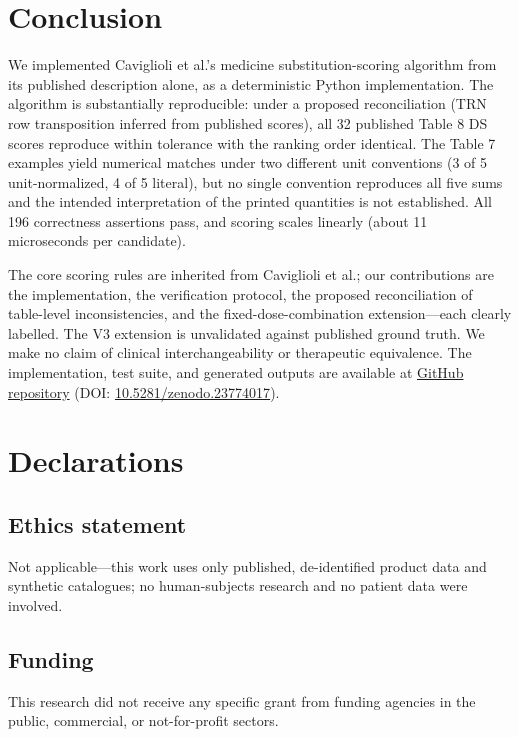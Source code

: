 \documentclass[a4paper]{elsarticle}
\begin{document}
\section{Conclusion}
\label{sec:conclusion}

We implemented Caviglioli et al.\citep{caviglioli2025medicine}'s medicine \linebreak[4]\mbox{substitution-scoring} algorithm from its published description alone, as a deterministic Python implementation. The algorithm is substantially reproducible: under a proposed reconciliation (TRN row transposition inferred from published scores), all 32 published Table 8 DS scores reproduce within tolerance with the ranking order identical. The Table 7 examples yield numerical matches under two different unit conventions (3 of 5 unit-normalized, 4 of 5 literal), but no single convention reproduces all five sums and the intended interpretation of the printed quantities is not established. All 196 correctness assertions pass, and scoring scales linearly (about 11 microseconds per candidate).

{\sloppy The core scoring rules are inherited from Caviglioli et al.\citep{caviglioli2025medicine}; our contributions are the implementation, the verification protocol, the proposed reconciliation of table-level inconsistencies, and the fixed-dose-combination extension---each clearly labelled. The V3 extension is unvalidated against published ground truth. We make no claim of clinical interchangeability or therapeutic equivalence. The implementation, test suite, and generated outputs are available at \href{https://github.com/yashmahajan11234567/cmpb-medicine-substitution-scoring}{GitHub repository} (DOI: \href{https://doi.org/10.5281/zenodo.23774017}{10.5281/zenodo.23774017}).}

\section{Declarations}

\subsection{Ethics statement}
Not applicable---this work uses only published, de-identified product data and synthetic catalogues; no human-subjects research and no patient data were involved.

\subsection{Funding}
This research did not receive any specific grant from funding agencies in the public, commercial, or not-for-profit sectors.
\end{document}
